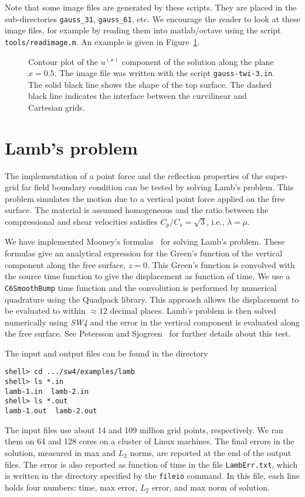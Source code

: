\documentclass[11pt]{report}
\begin{document}
Note that some image files are generated by these scripts. They are placed in the sub-directories
\verb+gauss_31+, \verb+gauss_61+, etc. We encourage the reader to look at these image files, for
example by reading them into matlab/octave using the script \verb+tools/readimage.m+. An example is
given in Figure~\ref{fig:ux}.
\begin{figure}
\begin{center}
\caption{Contour plot of the $u^{(x)}$ component of the solution along the plane $x=0.5$. The image
  file was written with the script {\tt gauss-twi-3.in}. The solid black line shows the shape of the
  top surface. The dashed black line indicates the interface between the curvilinear and Cartesian
  grids.}
\label{fig:ux}
\end{center}
\end{figure}


\section{Lamb's problem}\label{sec:lamb}

The implementation of a point force and the reflection properties of the super-grid far field
boundary condition can be tested by solving Lamb's problem. This problem simulates the motion due to
a vertical point force applied on the free surface. The material is assumed homogeneous and the
ratio between the compressional and shear velocities satisfies $C_p/C_s = \sqrt{3}$, i.e.,
$\lambda=\mu$. 

We have implemented Mooney's formulas~\cite{Mooney_1974} for solving Lamb's problem. These formulas
give an analytical expression for the Green's function of the vertical component along the free
surface, $z=0$. This Green's function is convolved with the source time function to give the
displacement as function of time. We use a {\tt C6SmoothBump} time function and the convolution is
performed by numerical quadrature using the Quadpack library. This approach allows the displacement
to be evaluated to within $\approx 12$ decimal places. Lamb's problem is then solved numerically
using \emph{SW4} and the error in the vertical component is evaluated along the free surface. See
Petersson and Sjogreen~\cite{PetSjo-13} for further details about this test.

The input and output files can be found in the directory
\begin{verbatim}
shell> cd .../sw4/examples/lamb
shell> ls *.in
lamb-1.in  lamb-2.in
shell> ls *.out
lamb-1.out  lamb-2.out
\end{verbatim}
The input files use about 14 and 109 million grid points, respectively. We ran them on 64 and 128
cores on a cluster of Linux machines. The final errors in the solution, measured in max and $L_2$
norms, are reported at the end of the output files. The error is also reported as function of time
in the file {\tt LambErr.txt}, which is written in the directory specified by the {\tt fileio}
command. In this file, each line holds four numbers: time, max error, $L_2$ error, and max norm of
solution.
\end{document}
